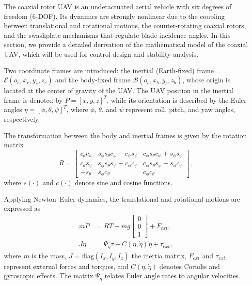 The coaxial rotor UAV is an underactuated aerial vehicle with six degrees of freedom (6-DOF). Its dynamics are strongly nonlinear due to the coupling between translational and rotational motions, the counter-rotating coaxial rotors, and the swashplate mechanisms that regulate blade incidence angles. In this section, we provide a detailed derivation of the mathematical model of the coaxial UAV, which will be used for control design and stability analysis.

Two coordinate frames are introduced: the inertial (Earth-fixed) frame $\mathcal{E}(o_e,x_e,y_e,z_e)$ and the body-fixed frame $\mathcal{B}(o_b,x_b,y_b,z_b)$, whose origin is located at the center of gravity of the UAV. The UAV position in the inertial frame is denoted by $P = [x,y,z]^T$, while its orientation is described by the Euler angles $\eta = [\phi, \theta, \psi]^T$, where $\phi$, $\theta$, and $\psi$ represent roll, pitch, and yaw angles, respectively.

The transformation between the body and inertial frames is given by the rotation matrix
\begin{equation}
R =
\begin{bmatrix}
c_\theta c_\psi & s_\phi s_\theta c_\psi - c_\phi s_\psi & c_\phi s_\theta c_\psi + s_\phi s_\psi \\
c_\theta s_\psi & s_\phi s_\theta s_\psi + c_\phi c_\psi & c_\phi s_\theta s_\psi - s_\phi c_\psi \\
-s_\theta       & s_\phi c_\theta                         & c_\phi c_\theta
\end{bmatrix},
\end{equation}
where $s(\cdot)$ and $c(\cdot)$ denote sine and cosine functions.

Applying Newton–Euler dynamics, the translational and rotational motions are expressed as
\begin{align}
m\ddot{P} &= RT - mg
\begin{bmatrix}
0 \\ 0 \\ 1
\end{bmatrix}
+ F_{ext}, \\
J\ddot{\eta} &= \Psi_\eta \tau - C(\eta,\dot{\eta})\dot{\eta} + \tau_{ext},
\end{align}
where $m$ is the mass, $J = \text{diag}(I_x,I_y,I_z)$ the inertia matrix, $F_{ext}$ and $\tau_{ext}$ represent external forces and torques, and $C(\eta,\dot{\eta})$ denotes Coriolis and gyroscopic effects. The matrix $\Psi_\eta$ relates Euler angle rates to angular velocities.

